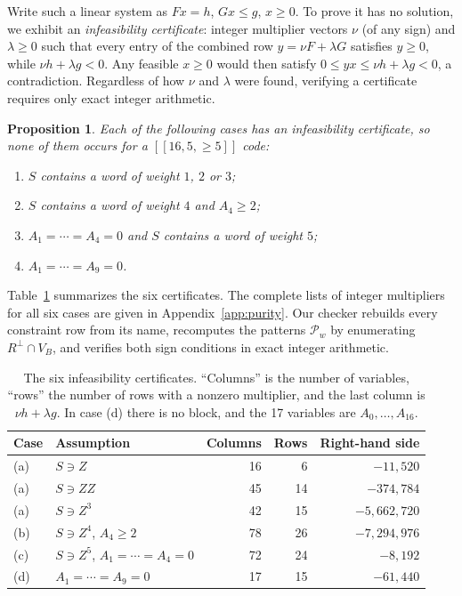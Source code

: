 \documentclass[11pt]{article}
\newtheorem{proposition}[theorem]{Proposition}
\theoremstyle{definition}
\theoremstyle{remark}
\newcommand{\qc}[1]{[\![#1]\!]}
\begin{document}
Write such a linear system as \(Fx=h\), \(Gx\leq g\), \(x\geq0\). To
prove it has no solution, we exhibit an \emph{infeasibility
certificate}: integer multiplier vectors \(\nu\) (of any sign) and
\(\lambda\geq0\) such that every entry of the combined row
\(y=\nu F+\lambda G\) satisfies \(y\geq0\), while
\(\nu h+\lambda g<0\). Any feasible \(x\geq0\) would then satisfy
\(0\leq yx\leq\nu h+\lambda g<0\), a contradiction. Regardless of how
\(\nu\) and \(\lambda\) were found, verifying a certificate requires
only exact integer arithmetic.

\begin{proposition}\label{prop:certs}
Each of the following cases has an infeasibility certificate, so none
of them occurs for a \(\qc{16,5,{\geq}5}\) code:
\begin{enumerate}[label=(\alph*)]
\item \(S\) contains a word of weight \(1\), \(2\) or \(3\);
\item \(S\) contains a word of weight \(4\) and \(A_4\geq2\);
\item \(A_1=\cdots=A_4=0\) and \(S\) contains a word of weight \(5\);
\item \(A_1=\cdots=A_9=0\).
\end{enumerate}
\end{proposition}

Table~\ref{tab:certs} summarizes the six certificates. The complete
lists of integer multipliers for all six cases are given in
Appendix~\ref{app:purity}. Our checker rebuilds every constraint row
from its name, recomputes the patterns \(\mathcal P_w\) by enumerating
\(R^\perp\cap V_B\), and verifies both sign conditions in exact integer
arithmetic.

\begin{table}[htbp]
\centering\small
\caption{The six infeasibility certificates. ``Columns'' is the number
of variables, ``rows'' the number of rows with a nonzero multiplier, and
the last column is \(\nu h+\lambda g\). In case (d) there is no block,
and the 17 variables are \(A_0,\ldots,A_{16}\).}\label{tab:certs}
\begin{tabular}{@{}llrrr@{}}\toprule
Case&Assumption&Columns&Rows&Right-hand side\\\midrule
(a)&\(S\ni Z\)&16&6&\(-11{,}520\)\\
(a)&\(S\ni ZZ\)&45&14&\(-374{,}784\)\\
(a)&\(S\ni Z^3\)&42&15&\(-5{,}662{,}720\)\\
(b)&\(S\ni Z^4\), \(A_4\geq2\)&78&26&\(-7{,}294{,}976\)\\
(c)&\(S\ni Z^5\), \(A_1=\cdots=A_4=0\)&72&24&\(-8{,}192\)\\
(d)&\(A_1=\cdots=A_9=0\)&17&15&\(-61{,}440\)\\\bottomrule
\end{tabular}
\end{table}
\end{document}
